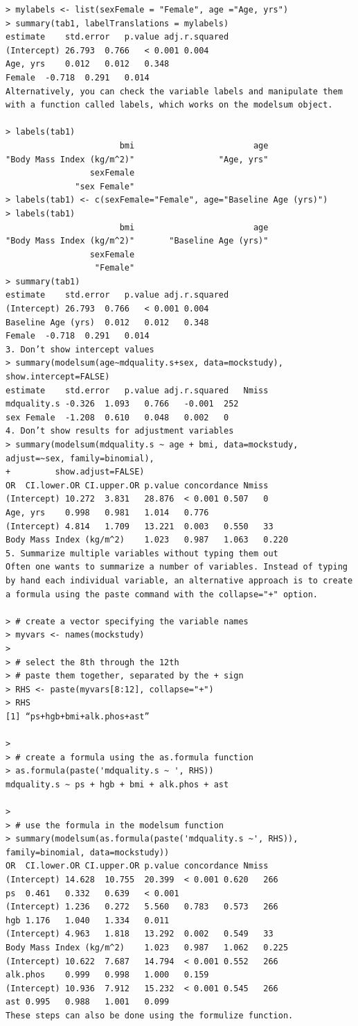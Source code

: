 \documentclass[
]{book}
\begin{document}
\begin{verbatim}
> mylabels <- list(sexFemale = "Female", age ="Age, yrs")
> summary(tab1, labelTranslations = mylabels)
estimate    std.error   p.value adj.r.squared
(Intercept) 26.793  0.766   < 0.001 0.004
Age, yrs    0.012   0.012   0.348   
Female  -0.718  0.291   0.014   
Alternatively, you can check the variable labels and manipulate them with a function called labels, which works on the modelsum object.

> labels(tab1)
                       bmi                        age 
"Body Mass Index (kg/m^2)"                 "Age, yrs" 
                 sexFemale 
              "sex Female" 
> labels(tab1) <- c(sexFemale="Female", age="Baseline Age (yrs)")
> labels(tab1)
                       bmi                        age 
"Body Mass Index (kg/m^2)"       "Baseline Age (yrs)" 
                 sexFemale 
                  "Female" 
> summary(tab1)
estimate    std.error   p.value adj.r.squared
(Intercept) 26.793  0.766   < 0.001 0.004
Baseline Age (yrs)  0.012   0.012   0.348   
Female  -0.718  0.291   0.014   
3. Don’t show intercept values
> summary(modelsum(age~mdquality.s+sex, data=mockstudy), show.intercept=FALSE)
estimate    std.error   p.value adj.r.squared   Nmiss
mdquality.s -0.326  1.093   0.766   -0.001  252
sex Female  -1.208  0.610   0.048   0.002   0
4. Don’t show results for adjustment variables
> summary(modelsum(mdquality.s ~ age + bmi, data=mockstudy, adjust=~sex, family=binomial),
+         show.adjust=FALSE)  
OR  CI.lower.OR CI.upper.OR p.value concordance Nmiss
(Intercept) 10.272  3.831   28.876  < 0.001 0.507   0
Age, yrs    0.998   0.981   1.014   0.776       
(Intercept) 4.814   1.709   13.221  0.003   0.550   33
Body Mass Index (kg/m^2)    1.023   0.987   1.063   0.220       
5. Summarize multiple variables without typing them out
Often one wants to summarize a number of variables. Instead of typing by hand each individual variable, an alternative approach is to create a formula using the paste command with the collapse="+" option.

> # create a vector specifying the variable names
> myvars <- names(mockstudy)
> 
> # select the 8th through the 12th
> # paste them together, separated by the + sign
> RHS <- paste(myvars[8:12], collapse="+")
> RHS
[1] “ps+hgb+bmi+alk.phos+ast”

> 
> # create a formula using the as.formula function
> as.formula(paste('mdquality.s ~ ', RHS))
mdquality.s ~ ps + hgb + bmi + alk.phos + ast

> 
> # use the formula in the modelsum function
> summary(modelsum(as.formula(paste('mdquality.s ~', RHS)), family=binomial, data=mockstudy))
OR  CI.lower.OR CI.upper.OR p.value concordance Nmiss
(Intercept) 14.628  10.755  20.399  < 0.001 0.620   266
ps  0.461   0.332   0.639   < 0.001     
(Intercept) 1.236   0.272   5.560   0.783   0.573   266
hgb 1.176   1.040   1.334   0.011       
(Intercept) 4.963   1.818   13.292  0.002   0.549   33
Body Mass Index (kg/m^2)    1.023   0.987   1.062   0.225       
(Intercept) 10.622  7.687   14.794  < 0.001 0.552   266
alk.phos    0.999   0.998   1.000   0.159       
(Intercept) 10.936  7.912   15.232  < 0.001 0.545   266
ast 0.995   0.988   1.001   0.099       
These steps can also be done using the formulize function.


\end{verbatim}
\end{document}
